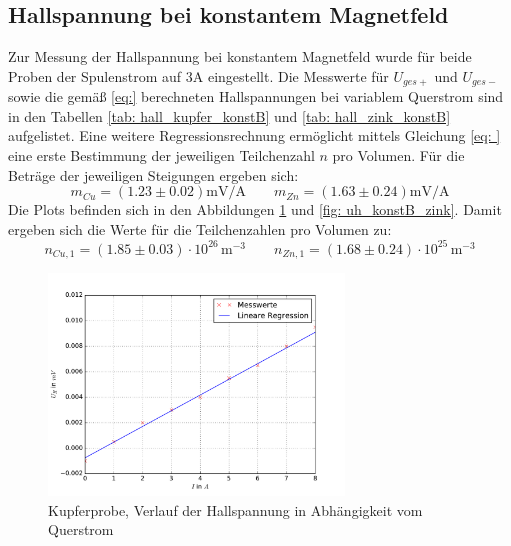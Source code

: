 \subsection{Hallspannung bei konstantem Magnetfeld}
Zur Messung der Hallspannung bei konstantem Magnetfeld wurde für beide Proben der Spulenstrom auf $3\si{\ampere}$ eingestellt. Die
Messwerte für $U_{ges+}$ und $U_{ges-}$ sowie die gemäß \eqref{eq:} berechneten Hallspannungen bei variablem Querstrom sind in den
Tabellen \ref{tab: hall_kupfer_konstB} und \ref{tab: hall_zink_konstB} aufgelistet. Eine weitere Regressionsrechnung ermöglicht mittels Gleichung \eqref{eq: } eine
erste Bestimmung der jeweiligen Teilchenzahl $n$ pro Volumen. Für die Beträge der jeweiligen Steigungen ergeben sich:
\begin{equation}
  m_{Cu} = (1.23 \pm 0.02)\si{\milli \volt \per \ampere}  \quad \quad m_{Zn} = (1.63 \pm 0.24)\si{\milli \volt \per \ampere}
\end{equation}
Die Plots befinden sich in den Abbildungen \ref{fig: uh_konstB_kupfer} und \ref{fig: uh_konstB_zink}.
Damit ergeben sich die Werte für die Teilchenzahlen pro Volumen zu:
\begin{equation}
  n_{Cu,1} = (1.85 \pm 0.03)\cdot 10^{26}\,\si{ \meter^{-3}} \quad \quad n_{Zn,1} = (1.68\pm 0.24)\cdot 10^{25}\,\si{ \meter^{-3}}
\end{equation}


\begin{figure}
  \centering
  \includegraphics[width=0.7\textwidth]{pics/u_h_kupfer_konstB.pdf}
  \caption{Kupferprobe, Verlauf der Hallspannung in Abhängigkeit vom Querstrom}
  \label{fig: uh_konstB_kupfer}
\end{figure}

